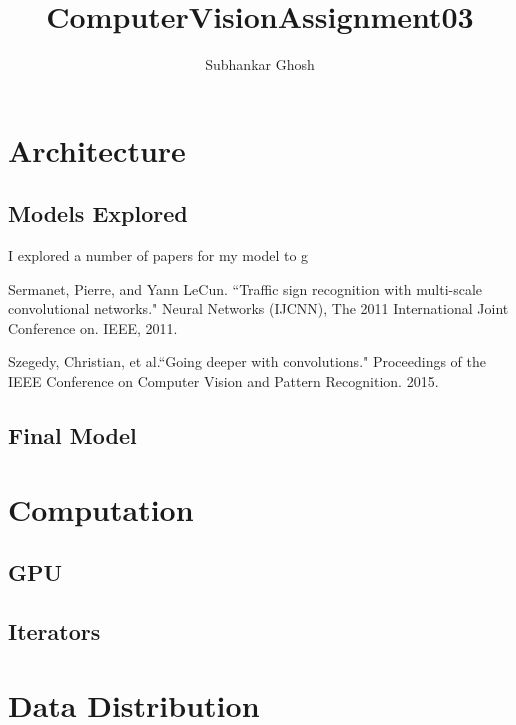 \documentclass{article}
\title{ComputerVisionAssignment03}
\author{Subhankar Ghosh}
\begin{document}
\section{Architecture}

\subsection{Models Explored}

I explored a number of papers for my model to g

Sermanet, Pierre, and Yann LeCun. ``Traffic sign recognition with multi-scale convolutional networks." Neural Networks (IJCNN), The 2011 International Joint Conference on. IEEE, 2011.

Szegedy, Christian, et al.``Going deeper with convolutions." Proceedings of the IEEE Conference on Computer Vision and Pattern Recognition. 2015.

\subsection{Final Model}

\section{Computation}

\subsection{GPU}

\subsection{Iterators}

\section{Data Distribution}
\end{document}

